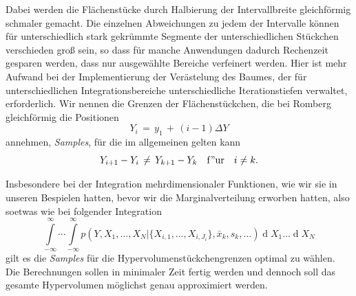 Dabei werden die Flächenstücke durch Halbierung der Intervallbreite gleichförmig schmaler gemacht.
Die einzelnen Abweichungen zu jedem der Intervalle können für unterschiedlich stark gekrümmte
Segmente der unterschiedlichen Stückchen verschieden groß sein, so dass für manche
Anwendungen dadurch Rechenzeit gesparen werden, dass nur ausgewählte Bereiche
verfeinert werden. Hier ist mehr Aufwand bei der Implementierung der Verästelung des Baumes,
der für unterschiedlichen Integrationsbereiche unterschiedliche Iterationstiefen verwaltet,
erforderlich. Wir nennen die Grenzen der Flächenstückchen, die bei Romberg gleichförmig die Positionen
$$
Y_i \, = \, y_1 \, + \, (i-1) \Delta Y
$$
annehmen, \textsl{Samples}, für die im allgemeinen gelten kann
\begin{equation}
Y_{i+1} - Y_i \, \neq \, Y_{k+1} - Y_k \quad \mathrm{f{"u}r} \quad i \neq k .
\end{equation}


Insbesondere bei der Integration mehrdimensionaler Funktionen, wie wir sie
in unseren Bespielen hatten, bevor wir die Marginalverteilung erworben hatten,
also soetwas wie bei folgender Integration
$$
\int\limits_{-\infty}^\infty \cdots \int\limits_{-\infty}^\infty
p(Y, X_1, \dots, X_N | \{X_{i,1}, \dots, X_{i,J_i}\}, \bar x_k, s_k, \dots)
\operatorname{d}X_1 \dots \operatorname{d}X_N
$$
gilt es die \textsl{Samples} für die Hypervolumenstückchengrenzen optimal zu wählen.
Die Berechnungen sollen in minimaler Zeit fertig werden und dennoch soll das
gesamte Hypervolumen möglichst genau approximiert werden.

